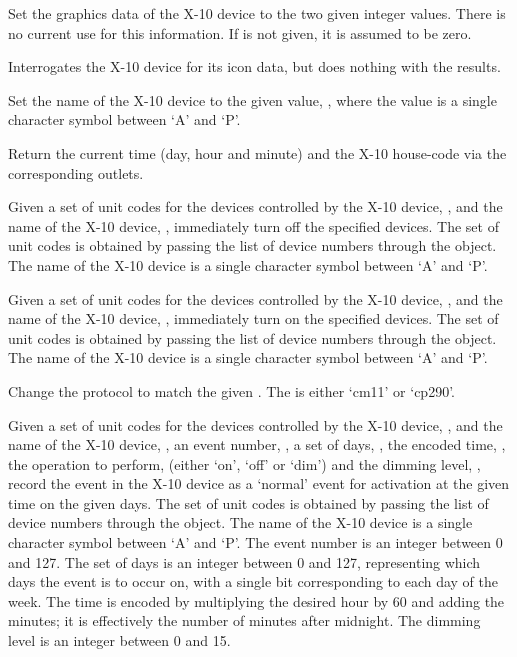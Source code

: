   Set the graphics data of the X-10 device to the two given integer values.
  There is no current use for this information.
  If  is not given, it is assumed to be zero.

  Interrogates the X-10 device for its icon data, but does nothing with the results.

  Set the name of the X-10 device to the given value, , where the value is a
  single character symbol between `A' and `P'.

  Return the current time (day, hour and minute) and the X-10 house-code via the corresponding outlets.

  Given a set of unit codes for the devices controlled by the X-10 device, , and the
  name of the X-10 device, , immediately turn off the specified devices.
  The set of unit codes is obtained by passing the list of device numbers through the
   object.
  The name of the X-10 device is a single character symbol between `A' and `P'.

  Given a set of unit codes for the devices controlled by the X-10 device, , and
  the name of the X-10 device, , immediately turn on the specified devices.
  The set of unit codes is obtained by passing the list of device numbers through the
   object.
  The name of the X-10 device is a single character symbol between `A' and `P'.

  Change the protocol to match the given .
  The  is either `cm11' or `cp290'.
  
  Given a set of unit codes for the devices controlled by the X-10 device, , and
  the name of the X-10 device, , an event number, ,
  a set of days, , the encoded time, , the operation to
  perform,  (either `on', `off' or `dim') and the dimming level,
  , record the event in the X-10 device as a `normal' event for activation at
  the given time on the given days.
  The set of unit codes is obtained by passing the list of device numbers through the
   object.
  The name of the X-10 device is a single character symbol between `A' and `P'.
  The event number is an integer between 0 and 127.
  The set of days is an integer between 0 and 127, representing which days the event is to occur on,
  with a single bit corresponding to each day of the week.
  The time is encoded by multiplying the desired hour by 60 and adding the minutes; it is
  effectively the number of minutes after midnight.
  The dimming level is an integer between 0 and 15.

